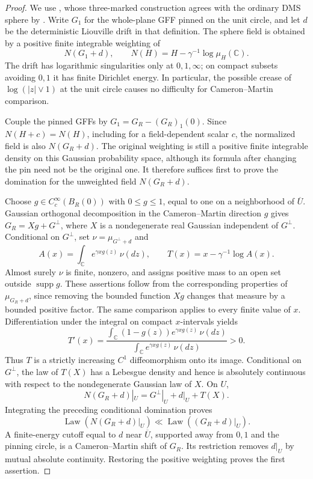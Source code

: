 \begin{proof}
We use \cite[Definition~2.2]{BorgaGwynneSunPermutons}, whose
three-marked construction agrees with the ordinary DMS sphere by
\cite[Theorem~1.1 and Remark~1.2]{AruHuangSunSphere}.
Write \(G_1\) for the whole-plane GFF pinned on the unit circle,
and let \(d\) be the deterministic Liouville drift in that definition.
The sphere field is obtained by a positive finite integrable weighting
of
\[
 N(G_1+d),\qquad
 N(H)=H-\gamma^{-1}\log\mu_H(\mathbb C).
\]
The drift has logarithmic singularities only at \(0,1,\infty\);
on compact subsets avoiding \(0,1\) it has finite Dirichlet energy.
In particular, the possible crease of \(\log(|z|\vee1)\) at the unit
circle causes no difficulty for Cameron--Martin comparison.

Couple the pinned GFFs by
\(G_1=G_R-(G_R)_1(0)\). Since \(N(H+c)=N(H)\), including for a
field-dependent scalar \(c\), the normalized field is also
\(N(G_R+d)\). The original weighting is still a positive finite
integrable density on this Gaussian probability space, although its
formula after changing the pin need not be the original one. It
therefore suffices first to prove the domination for the unweighted
field \(N(G_R+d)\).

Choose \(g\in C_c^\infty(B_R(0))\) with \(0\le g\le1\), equal to one
on a neighborhood of \(\overline U\). Gaussian orthogonal
decomposition in the Cameron--Martin direction \(g\) gives
\(G_R=Xg+G^\perp\), where \(X\) is a nondegenerate real Gaussian
independent of \(G^\perp\). Conditional on \(G^\perp\), set
\(\nu=\mu_{G^\perp+d}\) and
\[
 A(x)=\int_{\mathbb C}e^{\gamma xg(z)}\,\nu(dz),
 \qquad T(x)=x-\gamma^{-1}\log A(x).
\]
Almost surely \(\nu\) is finite, nonzero, and assigns positive mass to
an open set outside \(\operatorname{supp}g\). These assertions follow
from the corresponding properties of \(\mu_{G_R+d}\), since removing
the bounded function \(Xg\) changes that measure by a bounded positive
factor. The same comparison applies to every finite value of \(x\).
Differentiation under the integral on compact \(x\)-intervals yields
\[
 T'(x)=
 \frac{\displaystyle\int_{\mathbb C}(1-g(z))e^{\gamma xg(z)}\,\nu(dz)}
      {\displaystyle\int_{\mathbb C}e^{\gamma xg(z)}\,\nu(dz)}>0 .
\]
Thus \(T\) is a strictly increasing \(C^1\) diffeomorphism onto its
image. Conditional on \(G^\perp\), the law of \(T(X)\) has a
Lebesgue density and hence is absolutely continuous with respect to
the nondegenerate Gaussian law of \(X\). On \(U\),
\[
 N(G_R+d)|_U=G^\perp|_U+d|_U+T(X).
\]
Integrating the preceding conditional domination proves
\[
 \operatorname{Law}(N(G_R+d)|_U)
 \ll \operatorname{Law}((G_R+d)|_U).
\]
A finite-energy cutoff equal to \(d\) near \(\overline U\), supported
away from \(0,1\) and the pinning circle, is a Cameron--Martin shift
of \(G_R\). Its restriction removes \(d|_U\) by mutual absolute
continuity. Restoring the positive weighting proves the first assertion.


\end{proof}
